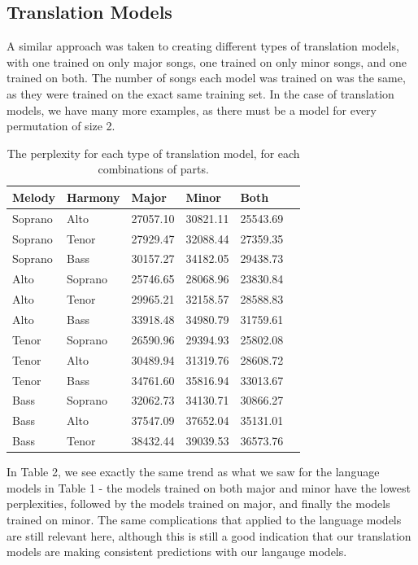 \documentclass{sig-alternate}
\begin{document}
\subsection{Translation Models}
A similar approach was taken to creating different types of translation models, with one trained on only major songs, one trained on only minor songs, and one trained on both. The number of songs each model was trained on was the same, as they were trained on the exact same training set. In the case of translation models, we have many more examples, as there must be a model for every permutation of size 2.
\begin{table}[h]
  \begin{center}
      \begin{tabular}{| l | l | l | l | l | l |}
      \hline
     Melody & Harmony & Major & Minor & Both \\ \hline
     Soprano & Alto & 27057.10 & 30821.11 & 25543.69 \\ \hline
     Soprano & Tenor & 27929.47 & 32088.44 & 27359.35 \\ \hline
     Soprano & Bass & 30157.27 & 34182.05 & 29438.73 \\ \hline
     Alto & Soprano & 25746.65 & 28068.96 & 23830.84 \\ \hline
     Alto & Tenor & 29965.21 & 32158.57 & 28588.83 \\ \hline
     Alto & Bass & 33918.48 & 34980.79 & 31759.61 \\ \hline
     Tenor & Soprano & 26590.96 & 29394.93 & 25802.08 \\ \hline
     Tenor & Alto & 30489.94 & 31319.76 & 28608.72 \\ \hline
     Tenor & Bass & 34761.60 & 35816.94 & 33013.67 \\ \hline
     Bass & Soprano & 32062.73 & 34130.71 & 30866.27 \\ \hline
     Bass & Alto & 37547.09 & 37652.04 & 35131.01 \\ \hline
     Bass & Tenor & 38432.44 & 39039.53 & 36573.76 \\ \hline
      \end{tabular}
  \end{center}
  \caption{The perplexity for each type of translation model, for each combinations of parts.}
\end{table}

In Table 2, we see exactly the same trend as what we saw for the language models in Table 1 - the models trained on both major and minor have the lowest perplexities, followed by the models trained on major, and finally the models trained on minor. The same complications that applied to the language models are still relevant here, although this is still a good indication that our translation models are making consistent predictions with our langauge models.
\end{document}
